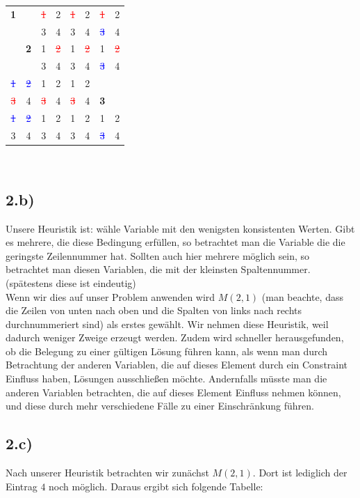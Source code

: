 \documentclass[a4paper]{article}
\begin{document}
\begin{tabular}{|cc|cc|cc|cc|}
\hline
\textbf{1} &  & \textcolor{red}{\sout{1}} & 2 & \textcolor{red}{\sout{1}} & 2 & \textcolor{red}{\sout{1}} & 2\\
  &  & 3 & 4 & 3 & 4 & \textcolor{blue}{\sout{3}} & 4\\
\hline
 & \textbf{2} & 1 & \textcolor{red}{\sout{2}} & 1 & \textcolor{red}{\sout{2}} & 1 & \textcolor{red}{\sout{2}}\\
  &  & 3 & 4 & 3 & 4 & \textcolor{blue}{\sout{3}} & 4\\
\hline
\textcolor{blue}{\sout{1}} & \textcolor{blue}{\sout{2}} & 1 & 2 & 1 & 2 &  & \\
 \textcolor{red}{\sout{3}} & 4 & \textcolor{red}{\sout{3}} & 4 & \textcolor{red}{\sout{3}} & 4 & \textbf{3} & \\
\hline
\textcolor{blue}{\sout{1}} & \textcolor{blue}{\sout{2}} & 1 & 2 & 1 & 2 & 1 & 2\\
 3 & 4 & 3 & 4 & 3 & 4 & \textcolor{blue}{\sout{3}} & 4\\
\hline
\end{tabular} \\

\subsection*{2.b)}
Unsere Heuristik ist: w\"ahle Variable mit den wenigsten konsistenten Werten. Gibt es mehrere, die diese Bedingung erf\"ullen, so betrachtet man die Variable die die geringste Zeilennummer hat. Sollten auch hier mehrere m\"oglich sein, so betrachtet man diesen Variablen, die mit der kleinsten Spaltennummer. (sp\"atestens diese ist eindeutig)\\
Wenn wir dies auf unser Problem anwenden wird $M(2,1)$ (man beachte, dass die Zeilen von unten nach oben und die Spalten von links nach rechts durchnummeriert sind) als erstes gew\"ahlt. Wir nehmen diese Heuristik, weil dadurch weniger Zweige erzeugt werden. Zudem wird schneller herausgefunden, ob die Belegung zu einer g\"ultigen  L\"osung f\"uhren kann, als wenn man durch Betrachtung der anderen Variablen, die auf dieses Element durch ein Constraint Einfluss haben, L\"osungen ausschlie\ss en m\"ochte. 
Andernfalls m\"usste man die anderen Variablen betrachten, die auf dieses Element Einfluss nehmen k\"onnen, und diese durch mehr verschiedene F\"alle zu einer Einschr\"ankung f\"uhren. \\

\subsection*{2.c)}
Nach unserer Heuristik betrachten wir zun\"achst $M(2,1)$. Dort ist lediglich der Eintrag $4$ noch möglich. Daraus ergibt sich folgende Tabelle:\\
\end{document}
